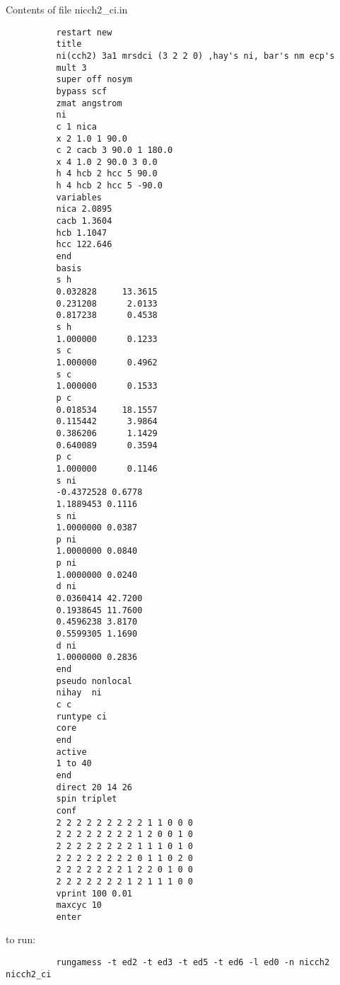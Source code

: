 \documentclass[11pt,fleqn]{article}
\begin{document}
Contents of file nicch2\_ci.in
{
\footnotesize
\begin{verbatim}
          restart new
          title
          ni(cch2) 3a1 mrsdci (3 2 2 0) ,hay's ni, bar's nm ecp's
          mult 3
          super off nosym
          bypass scf
          zmat angstrom
          ni
          c 1 nica
          x 2 1.0 1 90.0
          c 2 cacb 3 90.0 1 180.0
          x 4 1.0 2 90.0 3 0.0
          h 4 hcb 2 hcc 5 90.0
          h 4 hcb 2 hcc 5 -90.0
          variables
          nica 2.0895
          cacb 1.3604
          hcb 1.1047
          hcc 122.646
          end
          basis
          s h
          0.032828     13.3615
          0.231208      2.0133
          0.817238      0.4538
          s h
          1.000000      0.1233
          s c
          1.000000      0.4962
          s c
          1.000000      0.1533
          p c
          0.018534     18.1557
          0.115442      3.9864
          0.386206      1.1429
          0.640089      0.3594
          p c
          1.000000      0.1146
          s ni
          -0.4372528 0.6778
          1.1889453 0.1116
          s ni
          1.0000000 0.0387
          p ni
          1.0000000 0.0840
          p ni
          1.0000000 0.0240
          d ni
          0.0360414 42.7200
          0.1938645 11.7600
          0.4596238 3.8170
          0.5599305 1.1690
          d ni
          1.0000000 0.2836
          end
          pseudo nonlocal
          nihay  ni
          c c
          runtype ci
          core
          end
          active
          1 to 40
          end
          direct 20 14 26
          spin triplet
          conf
          2 2 2 2 2 2 2 2 2 1 1 0 0 0
          2 2 2 2 2 2 2 2 1 2 0 0 1 0
          2 2 2 2 2 2 2 2 1 1 1 0 1 0
          2 2 2 2 2 2 2 2 0 1 1 0 2 0
          2 2 2 2 2 2 2 1 2 2 0 1 0 0
          2 2 2 2 2 2 2 1 2 1 1 1 0 0
          vprint 100 0.01
          maxcyc 10
          enter
\end{verbatim}
}
to run:
{
\footnotesize
\begin{verbatim}
          rungamess -t ed2 -t ed3 -t ed5 -t ed6 -l ed0 -n nicch2 nicch2_ci
\end{verbatim}
}
\end{document}
